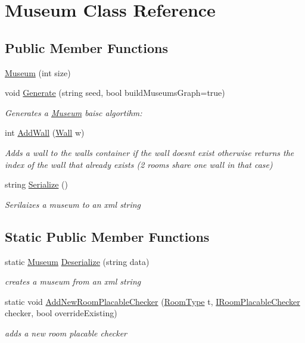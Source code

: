 \hypertarget{class_museum}{}\section{Museum Class Reference}
\label{class_museum}
\subsection*{Public Member Functions}
\begin{DoxyCompactItemize}
\item 
\mbox{\hyperlink{class_museum_aa946df02a55ba522f7a39ac688648733}{Museum}} (int size)
\item 
void \mbox{\hyperlink{class_museum_a2a301b4e27f35da164ffa03b3d3d7e81}{Generate}} (string seed, bool build\+Museums\+Graph=true)
\begin{DoxyCompactList}\small\item\em Generates a \mbox{\hyperlink{class_museum}{Museum}} baisc algortihm\+: \end{DoxyCompactList}\item 
int \mbox{\hyperlink{class_museum_a6e441db98efeaa314ae974222aea08e6}{Add\+Wall}} (\mbox{\hyperlink{class_wall}{Wall}} w)
\begin{DoxyCompactList}\small\item\em Adds a wall to the walls container if the wall doesn\textquotesingle{}t exist otherwise returns the index of the wall that already exists (2 rooms share one wall in that case) \end{DoxyCompactList}\item 
string \mbox{\hyperlink{class_museum_ac956bb7d7454f99944af157c79f695b8}{Serialize}} ()
\begin{DoxyCompactList}\small\item\em Serilaizes a museum to an xml string \end{DoxyCompactList}\end{DoxyCompactItemize}
\subsection*{Static Public Member Functions}
\begin{DoxyCompactItemize}
\item 
static \mbox{\hyperlink{class_museum}{Museum}} \mbox{\hyperlink{class_museum_a1b4fb627a19112e3ba3d25e8108de2c3}{Deserialize}} (string data)
\begin{DoxyCompactList}\small\item\em creates a museum from an xml string \end{DoxyCompactList}\item 
static void \mbox{\hyperlink{class_museum_a4317c41f1bef1ffeee3678f5c342c9aa}{Add\+New\+Room\+Placable\+Checker}} (\mbox{\hyperlink{_room_8cs_ab540f7414f306325d92272bcef1e34e1}{Room\+Type}} t, \mbox{\hyperlink{interface_i_room_placable_checker}{I\+Room\+Placable\+Checker}} checker, bool override\+Existing)
\begin{DoxyCompactList}\small\item\em adds a new room placable checker \end{DoxyCompactList}\end{DoxyCompactItemize}
